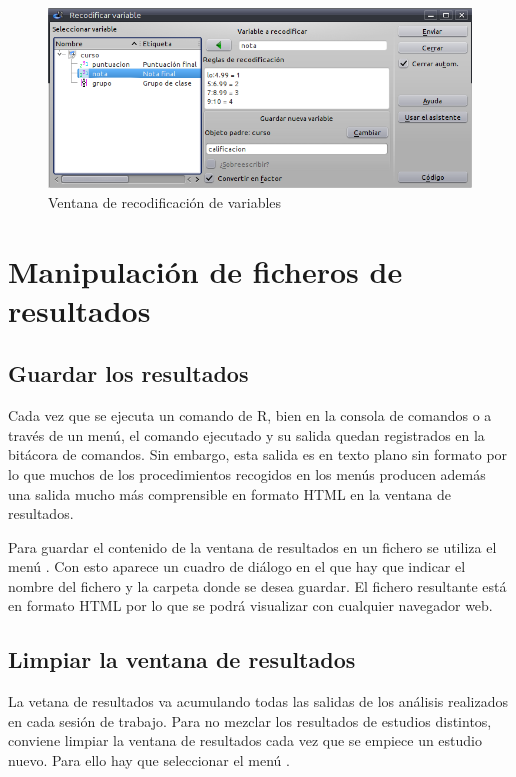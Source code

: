 \begin{figure}[htp]
\begin{center}
  \includegraphics[scale=0.6]{capitulos/introduccion/img/recodificar}
  \caption{Ventana de recodificación de variables}
  \label{g:recodificar_variable}
\end{center}
\end{figure} 


\section{Manipulación de ficheros de resultados}

\subsection{Guardar los resultados}
Cada vez que se ejecuta un comando de R, bien en la consola de comandos o a través de un menú, el comando ejecutado y su
salida quedan registrados en la bitácora de comandos. Sin embargo, esta salida es en texto plano sin formato por lo que
muchos de los procedimientos recogidos en los menús producen además una salida mucho más comprensible en formato HTML en
la ventana de resultados.

Para guardar el contenido de la ventana de resultados en un fichero se utiliza el menú .
Con esto aparece un cuadro de diálogo en el que hay que indicar el nombre del fichero y la carpeta donde se desea
guardar. El fichero resultante está en formato HTML por lo que se podrá visualizar con cualquier navegador web.

\subsection{Limpiar la ventana de resultados}
La vetana de resultados va acumulando todas las salidas de los análisis realizados en cada sesión de trabajo. 
Para no mezclar los resultados de estudios distintos, conviene limpiar la ventana de resultados cada vez que se empiece un estudio nuevo.
Para ello hay que seleccionar el menú .
 

